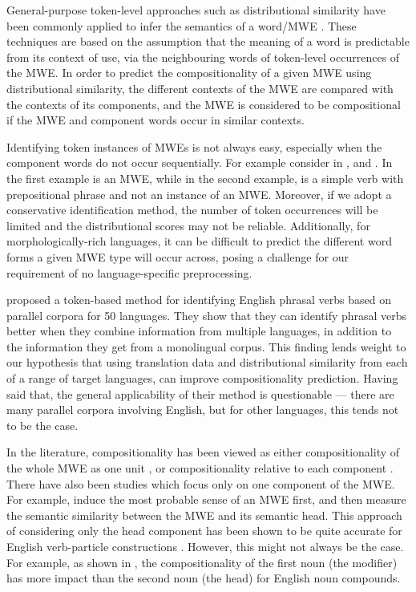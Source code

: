 \documentclass[output=paper
,modfonts
,nonflat]{langsci/langscibook}
\begin{document}
General-purpose token-level approaches such as distributional similarity
have been commonly applied to infer the semantics of a word/MWE
\citep{Schone2001,Baldwin:2003,reddy2011a}. These techniques are based on
the assumption that the meaning of a word is predictable from its
context of use, via the neighbouring words of token-level
occurrences of the MWE. In order to predict the compositionality of a
given MWE using distributional similarity, the different contexts of the
MWE are compared with the contexts of its components, and the MWE is
considered to be compositional if the MWE and component words occur in
similar contexts.

Identifying token instances of MWEs is not always easy, especially when
the component words do not occur sequentially. For example consider
 in , and
. In the first
example  is an MWE, while in the second example, 
is a simple verb with prepositional phrase and not an instance of an
MWE. Moreover, if we adopt a conservative identification method, the
number of token occurrences will be limited and the distributional
scores may not be reliable. Additionally, for morphologically-rich
languages, it can be difficult to predict the different word forms a
given MWE type will occur across, posing a challenge for our requirement
of no language-specific preprocessing.

\citet{pichotta2013} proposed a token-based method for identifying
English phrasal verbs based on parallel corpora for 50 languages. They
show that they can identify phrasal verbs better when they combine
information from multiple languages, in addition to the information
they get from a monolingual corpus. This finding lends weight to our
hypothesis that using translation data and distributional similarity
from each of a range of target languages, can improve compositionality
prediction. Having said that, the general applicability of their
method is questionable --- there are many parallel corpora involving
English, but for other languages, this tends not to be the case.


In the literature, compositionality has been viewed as either
compositionality of the whole MWE as one unit
\citep{mccarthy2003,venkatapathy2005,Katz06automaticidentification,Biemann2011,farahmand2015},
or compositionality relative to each component
\citep{reddy2011a,hermann2012,SchulteImWalde+:2013}.  There have also
been studies which focus only on one component of the MWE.  For
example, \cite{korkontzelos2009} induce the most probable sense of an
MWE first, and then measure the semantic similarity between the MWE
and its semantic head.  This approach of considering only the head
component has been shown to be quite accurate for English verb-particle 
constructions \citep{bannard2003}. However, this might not
always be the case.  For example, as shown in \cite{reddy2011a}, the
compositionality of the first noun (the modifier) has more impact than
the second noun (the head) for English noun compounds.
\end{document}
